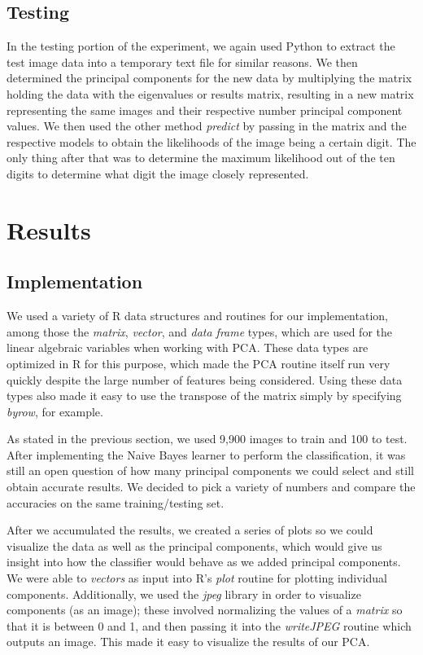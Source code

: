 \documentclass[twocolumn]{article}
\begin{document}
\subsection{Testing} %
\label{subsec:testing}
In the testing portion of the experiment, we again used Python to extract the test image data into a temporary text file for similar reasons. We then determined the principal components for the new data by multiplying the matrix holding the data with the eigenvalues or results matrix, resulting in a new matrix representing the same images and their respective number principal component values. We then used the other method \emph{predict} by passing in the matrix and the respective models to obtain the likelihoods of the image being a certain digit. The only thing after that was to determine the maximum likelihood out of the ten digits to determine what digit the image closely represented.
\section{Results} %
\label{sec:results}

\subsection{Implementation}
\label{subsec:narrative}

We used a variety of R data structures and routines for our implementation, among those the \emph{matrix}, \emph{vector}, and \emph{data frame} types, which are used for the linear algebraic variables when working with PCA. These data types are optimized in R for this purpose, which made the PCA routine itself run very quickly despite the large number of features being considered. Using these data types also made it easy to use the transpose of the matrix simply by specifying \emph{byrow}, for example.

As stated in the previous section, we used 9,900 images to train and 100 to test. After implementing the Naive Bayes learner to perform the classification, it was still an open question of how many principal components we could select and still obtain accurate results. We decided to pick a variety of numbers and compare the accuracies on the same training/testing set. 

After we accumulated the results, we created a series of plots so we could visualize the data as well as the principal components, which would give us insight into how the classifier would behave as we added principal components. We were able to \emph{vectors} as input into R's \emph{plot} routine for plotting individual components. Additionally, we used the \emph{jpeg} library \cite{writejpeg}
 in order to visualize components (as an image); these involved normalizing the values of a \emph{matrix} so that it is between 0 and 1, and then passing it into the \emph{writeJPEG} routine which outputs an image. This made it easy to visualize the results of our PCA.
\end{document}
